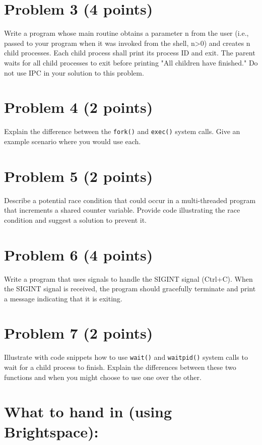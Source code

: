 \documentclass{article}
\begin{document}
\section*{Problem 3 (4 points)}

Write a program whose main routine obtains a parameter n from the user (i.e., passed to your program when it was invoked from the shell, n>0) and creates n child processes. Each child process shall print its process ID and exit.  The parent waits for all child processes to exit before printing "All children have finished." Do not use IPC in your solution to this problem.


\section*{Problem 4 (2 points)}

Explain the difference between the \texttt{fork()} and \texttt{exec()} system calls.  Give an example scenario where you would use each.


\section*{Problem 5 (2 points)}

Describe a potential race condition that could occur in a multi-threaded program that increments a shared counter variable.  Provide code illustrating the race condition and suggest a solution to prevent it.


\section*{Problem 6 (4 points)}

Write a program that uses signals to handle the SIGINT signal (Ctrl+C). When the SIGINT signal is received, the program should gracefully terminate and print a message indicating that it is exiting.


\section*{Problem 7 (2 points)}

Illustrate with code snippets how to use \texttt{wait()} and \texttt{waitpid()} system calls to wait for a child process to finish. Explain the differences between these two functions and when you might choose to use one over the other.


\section*{What to hand in (using Brightspace): }
\end{document}
